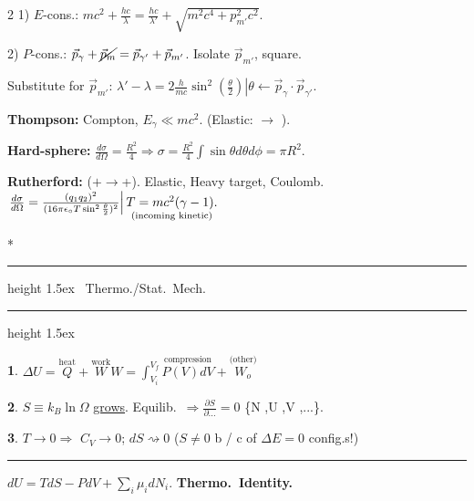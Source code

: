 \documentclass{article}
\makeatletter
\def\HrulefillThick{\leavevmode\leaders\hrule height 1.5ex \hfill\kern\z@}
\renewcommand{\section}[1]{%
     \@startsection{section}{1}{0mm}{0.01ex}{0.01ex}{%
         \normalfont\Large\bfseries\underline\centering }*{%
         \noindent\HrulefillThick%
              ~#1~\HrulefillThick}}
\makeatother
\begin{document}
\begin{multicols}{2}
1) $E$-cons.: $mc^{2}  +  \frac{hc}{\lambda}  = %
    \frac{hc}{\lambda'}  +  \sqrt{m^{2}c^{4} + p^{2}_{m'}c^{2}}$.

2) $P$-cons.: $\vec{p}_{\gamma}  +  \cancel{\vec{p}_{m}}  =  %
    \vec{p}_{\gamma'}  +  \vec{p}_{m'}$. Isolate $\vec{p}_{m'}$, square. 

Substitute for $\vec{p}_{m'}$: 
    $\left. \lambda'   -   \lambda  = %
    2\frac{h}{mc}\sin^{2}  \left( \frac{\theta}{2} \right)
    \right| 
     \theta  \leftarrow  \vec{p}_{\gamma}  \cdot \vec{p}_{\gamma'}$.

\textbf{Thompson:} Compton, $E_{\gamma}   \ll   mc^{2}$. 
    (Elastic:  \Neutral $\rightarrow  $ \Neutral ).

\textbf{Hard-sphere:} 
$\frac{d\sigma}{d\Omega}   =   \frac{R^{2}}{4} %
    \Rightarrow \sigma  =  %
    \frac{R^{2}}{4}  \int \sin \theta d\theta d\phi %
     =  \pi R^{2}  .$

\textbf{Rutherford:} (\Male$+$\Neutral$\rightarrow$\Male+\Neutral). 
Elastic, Heavy target, Coulomb. 
$\left. \frac{d\sigma}{d\Omega}  = %
    \frac{%
        (q_{1}q_{2})^{2}%
    }{%
        (16 \pi \epsilon_{ \circ} T \sin^{2} \frac{\theta}{2})^{2}%
    }%
 \right| \underset{%
        \text{(incoming kinetic)}%
    }{%
        T = mc^{2}( \gamma - 1 ).%
    }$



\section{Thermo./Stat.\ Mech.}

%
%
\textbf{1}. %
 $\Delta U = \overset{\text{heat}}{Q} + \overset{\text{work}}{W}%
      $\hfill\textbullet\hfill$%
      W = \int_{V_{i}}^{V_{f}} \overset{\text{compression}}{P(V) dV}  +%
        \overset{\text{(other)}}{W_{o}}$

\textbf{2}. %
  $S \equiv k_{ B} \ln\Omega$ \underline{grows}. Equilib.\ 
     $ \Rightarrow  \frac{\partial S}{\partial ...}   =  0$
\{N ,U ,V ,...\}.

\textbf{3}. %
 $T   \rightarrow   0  \Rightarrow $ %
    $C_{ V}   \rightarrow   0$; %
    $dS  \rightsquigarrow  0$ %
    {\tiny ($S   \neq   0$ b / c of $\Delta  E   =   0$ config.s!)}
\hrule
$dU  =  TdS  -  PdV  + \sum_{i} \mu_{i} dN_{i}.$\hfill%
\textbf{Thermo.\ Identity.}


\end{multicols}
\end{document}
